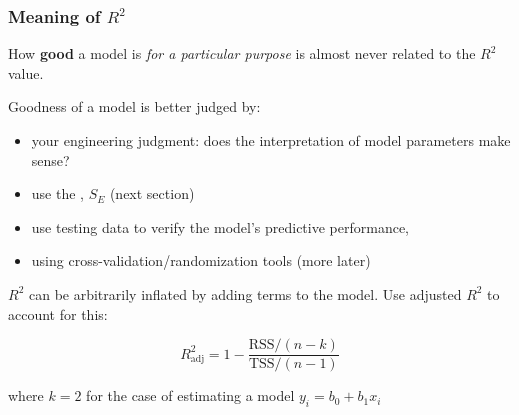 \begin{frame}\frametitle{Meaning of $R^2$}
	\begin{exampleblock}{}
		How \textbf{good} a model is \emph{for a particular purpose} is almost never related to the $R^2$ value.
	\end{exampleblock}

	\vspace{12pt}
	Goodness of a model is better judged by:
	\begin{itemize}
		\item	your engineering judgment: does the interpretation of model parameters make sense?
		\item	use the {\color{purple}{standard error}}, $S_E$ (next section)
		\item	use testing data to verify the model's predictive performance,
		\item	using cross-validation/randomization tools (more later)
	\end{itemize}

	$R^2$ can be arbitrarily inflated by adding terms to the model. Use adjusted $R^2$ to account for this:

	$$ R^2_\text{adj} = 1 - \dfrac{\text{RSS}/(n-k)}{\text{TSS}/(n-1)} $$

	where $k=2$ for the case of estimating a model $y_i = b_0 + b_1 x_i$
\end{frame}

